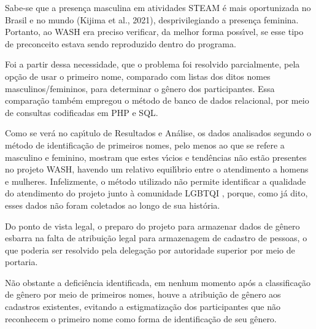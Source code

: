 \documentclass[
12pt,		%
openright,	%
twoside,  %
a4paper,			%
chapter=TITLE,		%
english,			%
french,				%
spanish,			%
brazil				%
]{USPSC-classe/USPSC_RedarTex}
\begin{document}
Sabe-se que a presen\c{c}a masculina em atividades STEAM \'e mais oportunizada no Brasil e no mundo (Kijima et al., 2021), desprivilegiando a presen\c{c}a feminina. Portanto, ao WASH era preciso verificar, da melhor forma poss\'{\i}vel, se esse tipo de preconceito estava sendo reproduzido dentro do programa.










Foi a partir dessa necessidade, que o problema foi resolvido parcialmente, pela op\c{c}\~ao de usar o primeiro nome, comparado com listas dos ditos nomes masculinos/femininos, para determinar o g\^enero dos participantes. Essa compara\c{c}\~ao tamb\'em empregou o m\'etodo de banco de dados relacional, por meio de consultas codificadas em PHP e SQL.










Como se ver\'a no cap\'{\i}tulo de Resultados e An\'alise, os dados analisados segundo o m\'etodo de identifica\c{c}\~ao de primeiros nomes, pelo menos ao que se refere a masculino e feminino, mostram que estes v\'{\i}cios e tend\^encias n\~ao est\~ao presentes no projeto WASH, havendo um relativo equil\'{\i}brio entre o atendimento a homens e mulheres. Infelizmente, o m\'etodo utilizado n\~ao permite identificar a qualidade do atendimento do projeto junto \`a comunidade LGBTQI , porque, como j\'a dito, esses dados n\~ao foram coletados ao longo de sua hist\'oria.










Do ponto de vista legal, o preparo do projeto para armazenar dados de g\^enero esbarra na falta de atribui\c{c}\~ao legal para armazenagem de cadastro de pessoas, o que poderia ser resolvido pela delega\c{c}\~ao por autoridade superior por meio de portaria.










N\~ao obstante a defici\^encia identificada, em nenhum momento ap\'os a classifica\c{c}\~ao de g\^enero por meio de primeiros nomes, houve a atribui\c{c}\~ao de g\^enero aos cadastros existentes, evitando a estigmatiza\c{c}\~ao dos participantes que n\~ao reconhecem o primeiro nome como forma de identifica\c{c}\~ao de seu g\^enero.
\end{document}
